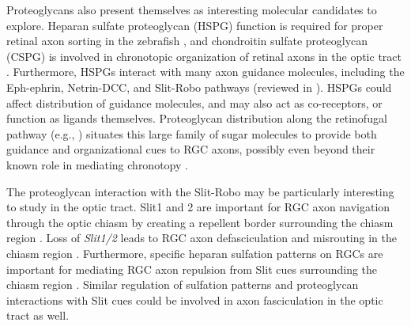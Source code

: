 Proteoglycans also present themselves as interesting molecular candidates to explore.
Heparan sulfate proteoglycan (HSPG) function is required for proper retinal axon sorting in the zebrafish \cite{lee2004axon}, and chondroitin sulfate proteoglycan (CSPG) is involved in chronotopic organization of retinal axons in the optic tract \cite{leung2003enzymatic}.
Furthermore, HSPGs interact with many axon guidance molecules, including the Eph-ephrin, Netrin-DCC, and Slit-Robo pathways (reviewed in ).
HSPGs could affect distribution of guidance molecules, and may also act as co-receptors, or function as ligands themselves.
Proteoglycan distribution along the retinofugal pathway (e.g., ) situates this large family of sugar molecules to provide both guidance and organizational cues to RGC axons, possibly even beyond their known role in mediating chronotopy \cite{leung2003enzymatic}.

The proteoglycan interaction with the Slit-Robo may be particularly interesting to study in the optic tract.
Slit1 and 2 are important for RGC axon navigation through the optic chiasm by creating a repellent border surrounding the chiasm region \cite{plump2002slit1}.
Loss of \emph{Slit1/2} leads to RGC axon defasciculation and misrouting in the chiasm region \cite{plump2002slit1}. 
Furthermore, specific heparan sulfation patterns on RGCs are important for mediating RGC axon repulsion from Slit cues surrounding the chiasm region \cite{pratt2006heparan}.
Similar regulation of sulfation patterns and proteoglycan interactions with Slit cues could be involved in axon fasciculation in the optic tract as well.

